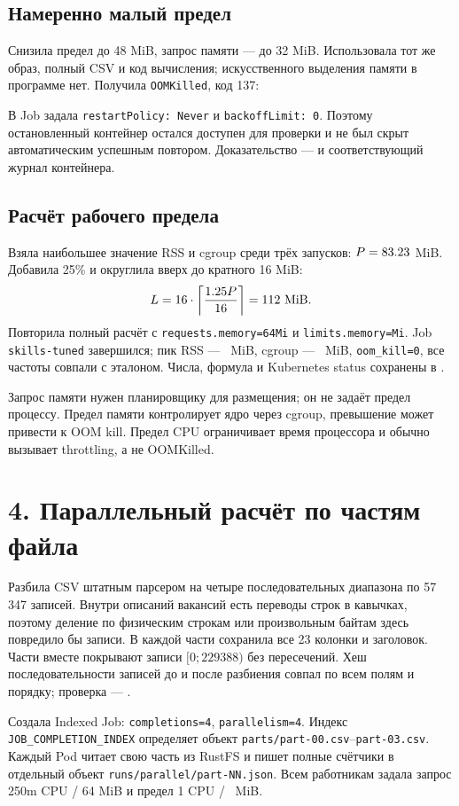 \documentclass[10pt,a4paper]{article}
\begin{document}
\subsection*{Намеренно малый предел}
Снизила предел до 48 MiB, запрос памяти --- до 32 MiB.
Использовала тот же образ, полный CSV и код вычисления; искусственного
выделения памяти в программе нет. Получила \texttt{OOMKilled}, код 137:

В Job задала \texttt{restartPolicy: Never} и \texttt{backoffLimit: 0}.
Поэтому остановленный контейнер остался доступен для проверки и не был
скрыт автоматическим успешным повтором. Доказательство ---
 и соответствующий журнал контейнера.

\subsection*{Расчёт рабочего предела}
Взяла наибольшее значение RSS и cgroup среди трёх запусков:
$P=83.23$ MiB. Добавила 25\% и округлила вверх до кратного 16 MiB:
\[
L=16\cdot\left\lceil\frac{1.25P}{16}\right\rceil
 = 112\ \text{MiB}.
\]
Повторила полный расчёт с \texttt{requests.memory=64Mi} и
\texttt{limits.memory=\LimitMiB Mi}. Job \texttt{skills-tuned} завершился;
пик RSS --- \TunedRSS\ MiB, cgroup --- \TunedCgroup\ MiB,
\texttt{oom\_kill=0}, все частоты совпали с эталоном.
Числа, формула и Kubernetes status сохранены в
.

Запрос памяти нужен планировщику для размещения; он не задаёт предел
процессу. Предел памяти контролирует ядро через cgroup, превышение может
привести к OOM kill. Предел CPU ограничивает время процессора и обычно
вызывает throttling, а не OOMKilled.

\clearpage
\section*{4. Параллельный расчёт по частям файла}
Разбила CSV штатным парсером на четыре последовательных диапазона по
57\,347 записей. Внутри описаний вакансий есть переводы строк в кавычках,
поэтому деление по физическим строкам или произвольным байтам здесь
повредило бы записи. В каждой части сохранила все 23 колонки и заголовок.
Части вместе покрывают записи $[0;229388)$ без пересечений.
Хеш последовательности записей до и после разбиения совпал по всем
полям и порядку; проверка --- .

Создала Indexed Job: \texttt{completions=4}, \texttt{parallelism=4}.
Индекс \texttt{JOB\_COMPLETION\_INDEX} определяет объект
\texttt{parts/part-00.csv}--\texttt{part-03.csv}. Каждый Pod читает свою
часть из RustFS и пишет полные счётчики в отдельный объект
\texttt{runs/parallel/part-NN.json}. Всем работникам задала запрос
250m CPU / 64 MiB и предел 1 CPU / \LimitMiB\ MiB.
\end{document}

